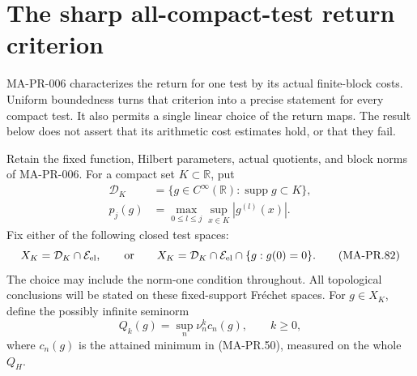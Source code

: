 \section{The sharp all-compact-test return criterion}
\label{sec:uniform-partial-return}

MA-PR-006 characterizes the return for one test by its
actual finite-block costs.  Uniform boundedness turns that
criterion into a precise statement for every compact test.
It also permits a single linear choice of the return maps.
The result below does not assert that its arithmetic cost
estimates hold, or that they fail.

Retain the fixed function, Hilbert parameters, actual
quotients, and block norms of MA-PR-006.
For a compact set \(K\subset\mathbb R\), put
\[
 \begin{aligned}
 \mathcal D_K
    &=\{g\in C^\infty(\mathbb R):\operatorname{supp}g\subset K\},\\
 p_j(g)&=\max_{0\le l\le j}\sup_{x\in K}|g^{(l)}(x)|.
 \end{aligned}
 \tag{MA-PR.81}
\]
Fix either of the following closed test spaces:
\[
 X_K=\mathcal D_K\cap\mathcal E_{\rm el},
 \qquad\hbox{or}\qquad
 X_K=\mathcal D_K\cap\mathcal E_{\rm el}
                              \cap\{g:g(0)=0\}.
 \tag{MA-PR.82}
\]
The choice may include the norm-one condition throughout.
All topological conclusions will be stated on these
fixed-support Fr\'echet spaces.
For \(g\in X_K\), define the possibly infinite seminorm
\[
              Q_k(g)=\sup_n\nu_n^k c_n(g),\qquad k\ge0,
 \tag{MA-PR.83}
\]
where \(c_n(g)\) is the attained minimum in (MA-PR.50),
measured on the whole \(Q_H\).

